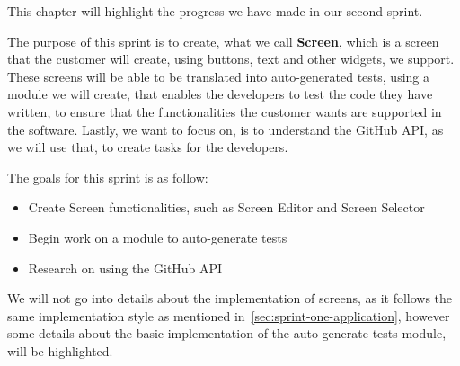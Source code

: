 This chapter will highlight the progress we have made in our second sprint.

The purpose of this sprint is to create, what we call \textbf{Screen}, which is a screen that the customer will create, using buttons, text and other widgets, we support.
These screens will be able to be translated into auto-generated tests, using a module we will create, that enables the developers to test the code they have written, to ensure that the functionalities the customer wants are supported in the software.
Lastly, we want to focus on, is to understand the GitHub API, as we will use that, to create tasks for the developers.

The goals for this sprint is as follow:

\begin{itemize}
    \item Create Screen functionalities, such as Screen Editor and Screen Selector
    \item Begin work on a module to auto-generate tests
    \item Research on using the GitHub API
\end{itemize}

We will not go into details about the implementation of screens, as it follows the same implementation style as mentioned in~\autoref{sec:sprint-one-application}, however some details about the basic implementation of the auto-generate tests module, will be highlighted.